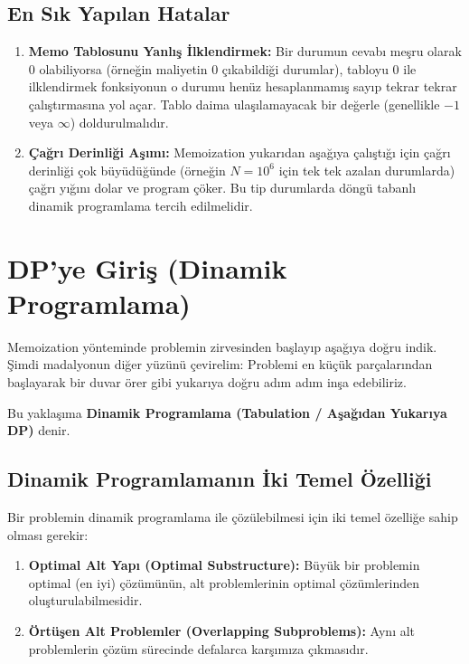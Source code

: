 \subsection*{En Sık Yapılan Hatalar}
\begin{enumerate}
    \item \textbf{Memo Tablosunu Yanlış İlklendirmek:} Bir durumun cevabı meşru olarak $0$ olabiliyorsa (örneğin maliyetin 0 çıkabildiği durumlar), tabloyu $0$ ile ilklendirmek fonksiyonun o durumu henüz hesaplanmamış sayıp tekrar tekrar çalıştırmasına yol açar. Tablo daima ulaşılamayacak bir değerle (genellikle $-1$ veya $\infty$) doldurulmalıdır.
    \item \textbf{Çağrı Derinliği Aşımı:} Memoization yukarıdan aşağıya çalıştığı için çağrı derinliği çok büyüdüğünde (örneğin $N=10^6$ için tek tek azalan durumlarda) çağrı yığını dolar ve program çöker. Bu tip durumlarda döngü tabanlı dinamik programlama tercih edilmelidir.
\end{enumerate}

\section{DP'ye Giriş (Dinamik Programlama)}

Memoization yönteminde problemin zirvesinden başlayıp aşağıya doğru indik. Şimdi madalyonun diğer yüzünü çevirelim: Problemi en küçük parçalarından başlayarak bir duvar örer gibi yukarıya doğru adım adım inşa edebiliriz.

Bu yaklaşıma \textbf{Dinamik Programlama (Tabulation / Aşağıdan Yukarıya DP)} denir.

\subsection{Dinamik Programlamanın İki Temel Özelliği}

Bir problemin dinamik programlama ile çözülebilmesi için iki temel özelliğe sahip olması gerekir:

\begin{definition}
\begin{enumerate}
    \item \textbf{Optimal Alt Yapı (Optimal Substructure):} Büyük bir problemin optimal (en iyi) çözümünün, alt problemlerinin optimal çözümlerinden oluşturulabilmesidir.
    \item \textbf{Örtüşen Alt Problemler (Overlapping Subproblems):} Aynı alt problemlerin çözüm sürecinde defalarca karşımıza çıkmasıdır.
\end{enumerate}
\end{definition}

